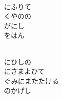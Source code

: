 \documentclass[10pt,b5j]{tarticle} %
\begin{document}
\begin{enumerate}
\begin{minipage}[c]{\blocksize}
        \vspace{\linespace}
        \item~\\
        にふりて\\
        くやのの\\
        がにし\\
        をはん
        
    \end{minipage}
    \begin{minipage}[c]{\blocksize}
        
        \vspace{\linespace}
        \item~\\
        にひしの\\
        にさまよひて\\
        ぐみにまたたける\\
        のかげし
    
    \end{minipage}
\end{enumerate} %
\end{document}

